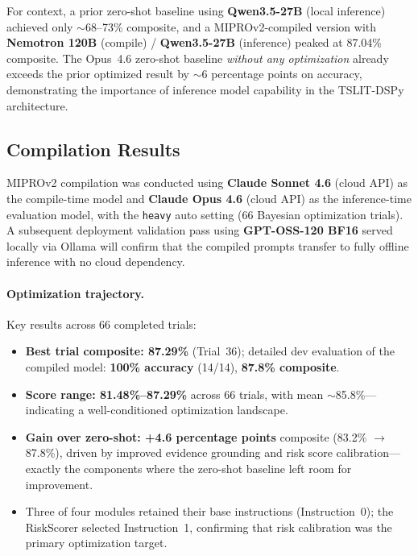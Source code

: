 \documentclass[11pt]{article}
\begin{document}
For context, a prior zero-shot baseline using \textbf{Qwen3.5-27B}
(local inference) achieved only $\sim$68--73\% composite, and a
MIPROv2-compiled version with \textbf{Nemotron 120B} (compile) /
\textbf{Qwen3.5-27B} (inference) peaked at 87.04\% composite. The
Opus~4.6 zero-shot baseline \emph{without any optimization} already
exceeds the prior optimized result by $\sim$6 percentage points on
accuracy, demonstrating the importance of inference model capability
in the TSLIT-DSPy architecture.

\subsection{Compilation Results}
\label{sec:compilation}

MIPROv2 compilation was conducted using \textbf{Claude Sonnet 4.6}
(cloud API) as the compile-time model and \textbf{Claude Opus 4.6}
(cloud API) as the inference-time evaluation model, with the
\texttt{heavy} auto setting (66 Bayesian optimization trials).
A subsequent deployment validation pass using \textbf{GPT-OSS-120
BF16} served locally via Ollama will confirm that the compiled prompts
transfer to fully offline inference with no cloud dependency.

\paragraph{Optimization trajectory.}
Key results across 66 completed trials:
\begin{itemize}[leftmargin=2em]
  \item \textbf{Best trial composite: 87.29\%} (Trial~36); detailed dev
    evaluation of the compiled model: \textbf{100\% accuracy} (14/14),
    \textbf{87.8\% composite}.
  \item \textbf{Score range: 81.48\%--87.29\%} across 66 trials,
    with mean $\sim$85.8\%---indicating a well-conditioned optimization
    landscape.
  \item \textbf{Gain over zero-shot: +4.6 percentage points} composite
    (83.2\% $\to$ 87.8\%), driven by improved evidence grounding and
    risk score calibration---exactly the components where the zero-shot
    baseline left room for improvement.
  \item Three of four modules retained their base instructions
    (Instruction~0); the RiskScorer selected Instruction~1, confirming
    that risk calibration was the primary optimization target.
\end{itemize}
\end{document}
